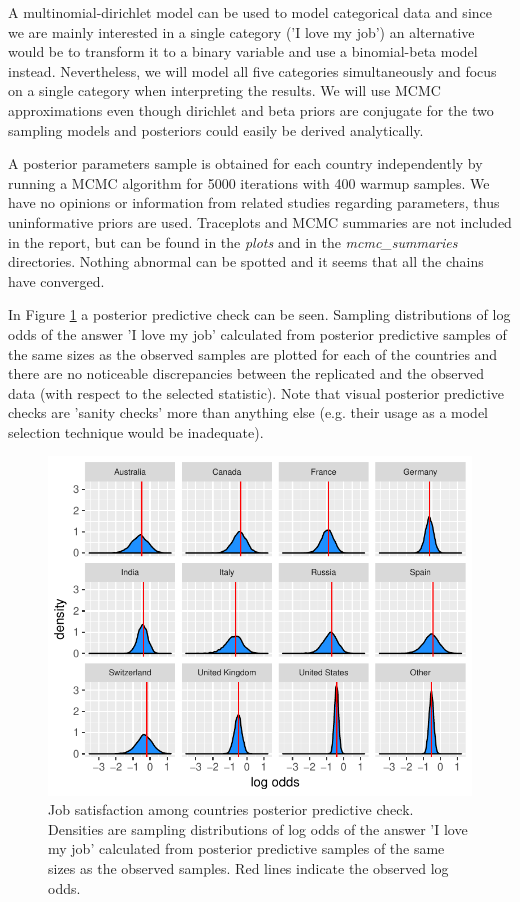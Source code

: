 \documentclass{article}
\begin{document}
A multinomial-dirichlet model can be used to model categorical data and since we are mainly interested in a single category ('I love my job') an alternative would be to transform it to a binary variable and use a binomial-beta model instead. Nevertheless, we will model all five categories simultaneously and focus on a single category when interpreting the results. We will use MCMC approximations even though dirichlet and beta priors are conjugate for the two sampling models and posteriors could easily be derived analytically.

A posterior parameters sample is obtained for each country independently by running a MCMC algorithm for 5000 iterations with 400 warmup samples. We have no opinions or information from related studies regarding parameters, thus uninformative priors are used. Traceplots and MCMC summaries are not included in the report, but can be found in the \textit{plots} and in the \textit{mcmc\_summaries} directories. Nothing abnormal can be spotted and it seems that all the chains have converged.

In Figure \ref{fig_1} a posterior predictive check can be seen. Sampling distributions of log odds of the answer 'I love my job' calculated from posterior predictive samples of the same sizes as the observed samples are plotted for each of the countries and there are no noticeable discrepancies between the replicated and the observed data (with respect to the selected statistic). Note that visual posterior predictive checks are 'sanity checks' more than anything else (e.g. their usage as a model selection technique would be inadequate).





\begin{figure}[H]
\centering
\includegraphics{report-010}
\caption{Job satisfaction among countries posterior predictive check. Densities are sampling distributions of log odds of the answer 'I love my job' calculated from posterior predictive samples of the same sizes as the observed samples. Red lines indicate the observed log odds.}\label{fig_1}
\end{figure}
\end{document}
